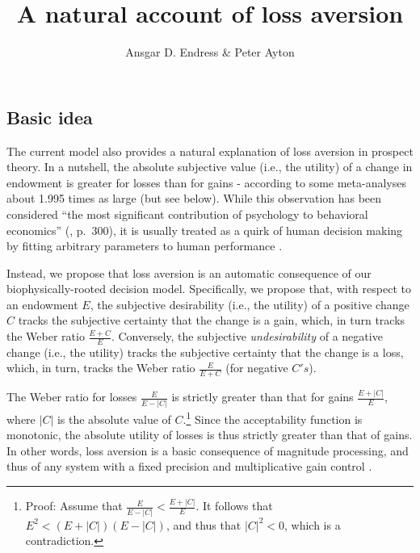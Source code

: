 \documentclass[
]{article}
\title{A natural account of loss aversion}
\author{Ansgar D. Endress \& Peter Ayton}
\date{}
\begin{document}
\maketitle

\subsection{Basic idea}\label{basic-idea}

The current model also provides a natural explanation of loss aversion
in prospect theory. In a nutshell, the absolute subjective value (i.e.,
the utility) of a change in endowment is greater for losses than for
gains - according to some meta-analyses about 1.995 times as large
\citep{Brown2024} (but see below). While this observation has been
considered ``the most significant contribution of psychology to
behavioral economics'' (\citep{Kahneman2011}, p.~300), it is usually
treated as a quirk of human decision making by fitting arbitrary
parameters to human performance
\citep{Tversky1992, Abdellaoui2007, Booij2009}.

Instead, we propose that loss aversion is an automatic consequence of
our biophysically-rooted decision model. Specifically, we propose that,
with respect to an endowment \(E\), the subjective desirability (i.e.,
the utility) of a positive change \(C\) tracks the subjective certainty
that the change is a gain, which, in turn tracks the Weber ratio
\(\frac{E + C}{E}\). Conversely, the subjective \emph{undesirability} of
a negative change (i.e., the utility) tracks the subjective certainty
that the change is a loss, which, in turn, tracks the Weber ratio
\(\frac{E}{E + C}\) (for negative \(C's\)).

The Weber ratio for losses \(\frac{E}{E - |C|}\) is strictly greater
than that for gains \(\frac{E + |C|}{E}\), where \(|C|\) is the absolute
value of \(C\).\footnote{Proof: Assume that
  \(\frac{E}{E - |C|} < \frac{E + |C|}{E}\). It follows that
  \(E^2 < (E + |C|)(E - |C|)\), and thus that \(|C|^2 < 0\), which is a
  contradiction.} Since the acceptability function is monotonic, the
absolute utility of losses is thus strictly greater than that of gains.
In other words, loss aversion is a basic consequence of magnitude
processing, and thus of any system with a fixed precision and
multiplicative gain control \citep{Endress-Catastrophic-Interference}.
\end{document}
